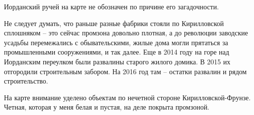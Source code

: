 Иорданский ручей на карте не обозначен по причине его загадочности.

Не следует думать, что раньше разные фабрики стояли по Кирилловской сплошняком – это сейчас промзона довольно плотная, а до революции заводские усадьбы перемежались с обывательскими, жилые дома могли прятаться за промышленными сооружениями, и так далее. Еще в 2014 году на горе над Иорданским переулком были развалины старого жилого домика. В 2015 их отгородили строительным забором. На 2016 год там – остатки развалин и рядом строительство.

На карте внимание уделено объектам по нечетной стороне Кирилловской-Фрунзе. Четная, которая у меня белая и пустая, на деле покрыта промзоной.
